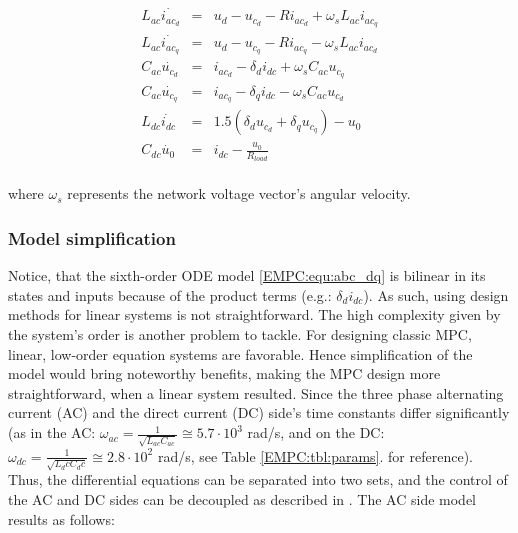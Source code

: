     \begin{equation}
        \begin{array}{rcl}
            L_{ac}\dot{i_{ac_d}}&=&u_d-u_{c_d}-Ri_{ac_d}+\omega_s L_{ac}i_{ac_q}\\
            L_{ac}\dot{i_{ac_q}}&=&u_d-u_{c_q}-Ri_{ac_q}-\omega_s L_{ac}i_{ac_d}\\
            C_{ac}\dot{u_{c_d}}&=&i_{ac_d}-\delta_di_{dc}+\omega_s C_{ac}u_{c_q}\\
            C_{ac}\dot{u_{c_q}}&=&i_{ac_q}-\delta_qi_{dc}-\omega_s C_{ac}u_{c_d}\\
            L_{dc}\dot{i_{dc}}&=&1.5(\delta_d u_{c_d}+\delta_q u_{c_q})-u_0\\
            C_{dc}\dot{u_0}&=&i_{dc}-\frac{u_0}{R_{load}}\\
        \end{array}
        \label{EMPC:equ:abc_dq}
    \end{equation}

    where $\omega_s$ represents the network voltage vector’s angular velocity.

    \subsubsection{Model simplification}\label{EMPC:sec:Simplification}

    Notice, that the sixth-order ODE model \ref{EMPC:equ:abc_dq} is bilinear in its states and
    inputs because of the product terms (e.g.: $\delta_di_{dc}$). As such, using design methods for linear systems is not straightforward. The high complexity given by the system’s order is another problem to tackle. For designing classic MPC, linear, low-order equation systems are favorable. Hence simplification of the model would bring noteworthy benefits, making the MPC design more straightforward, when a linear system resulted.
    Since the three phase alternating current (AC) and the direct current (DC) side’s time constants differ significantly (as in the AC: $\omega_{ac}=\frac{1}{\sqrt{L_{ac} C_{ac}}}\cong5.7\cdot10^3$ rad/s, and on the DC: $\omega_{dc}=\frac{1}{\sqrt{L_dc C_dc}}\cong2.8\cdot10^2$ rad/s, see Table \ref{EMPC:tbl:params}. for reference). Thus, the differential equations can be separated into two sets, and the control of the AC and DC sides can be decoupled as described in \cite{ahmed2014model}. The AC side model results as follows:


